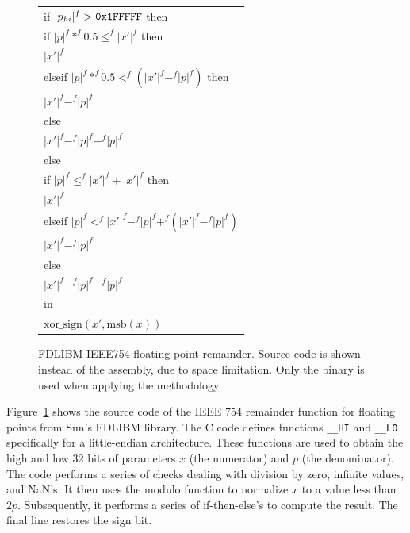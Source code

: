 \begin{figure}[htbp]
{{{{\begin{tabular}{l}
\hspace{2ex}if $|p_{\mathit{hi}}|^f > \mathtt{0x1FFFFF}$ then\\
\hspace{3ex}if $|p|^f *^f 0.5 \leq^f |x'|^f$ then\\
\hspace{4ex}$|x'|^f$\\
\hspace{3ex}elseif $|p|^f *^f 0.5 <^f (|x'|^f -^f |p|^f)$ then\\
\hspace{4ex}$|x'|^f -^f |p|^f$\\
\hspace{3ex}else\\
\hspace{4ex}$|x'|^f -^f |p|^f -^f |p|^f$\\
\hspace{2ex}else\\
\hspace{3ex}if $|p|^f \leq^f |x'|^f + |x'|^f$ then\\
\hspace{4ex}$|x'|^f$\\
\hspace{3ex}elseif $|p|^f <^f |x'|^f -^f |p|^f +^f (|x'|^f -^f |p|^f)$ \\
\hspace{4ex}$|x'|^f -^f |p|^f$\\
\hspace{3ex}else\\
\hspace{4ex}$|x'|^f -^f |p|^f -^f |p|^f$\\
\hspace{1ex}in\\
\hspace{2ex}$\mbox{xor\_sign}(x',\mbox{msb}(x))$\\
\end{tabular}
			}
        \vfil}%
			}
			\label{fig:hl_semantics}
	}%
	\caption{FDLIBM IEEE754 floating point remainder. Source code is shown instead of the assembly, due to space limitation. Only the binary is used when applying the methodology.}
	\label{fig:rem}
\end{figure}



Figure~\ref{fig:rem} shows the source code of the IEEE 754 remainder function for floating points from Sun's FDLIBM library.
The C code defines functions \texttt{\_\_HI} and \texttt{\_\_LO} specifically for a little-endian architecture.
These functions are used to obtain the high and low 32 bits of parameters $x$ (the numerator) and $p$ (the denominator).
The code performs a series of checks dealing with division by zero, infinite values, and NaN's.
It then uses the modulo function to normalize $x$ to a value less than~$2p$.
Subsequently, it performs a series of if-then-else's to compute the result.
The final line restores the sign bit.





